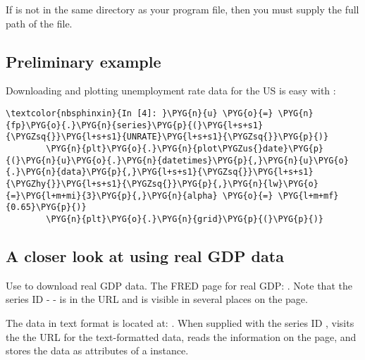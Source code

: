 \documentclass[letterpaper,10pt,openany,oneside,english]{sphinxmanual}
\begin{document}
If  is not in the same directory as your program
file, then you must supply the full path of the file.


\subsection{Preliminary example}
\label{\detokenize{fredpy_examples:Preliminary-example}}
Downloading and plotting unemployment rate data for the US is easy with
:

%
\begin{Verbatim}[commandchars=\\\{\}]
\textcolor{nbsphinxin}{In [4]: }\PYG{n}{u} \PYG{o}{=} \PYG{n}{fp}\PYG{o}{.}\PYG{n}{series}\PYG{p}{(}\PYG{l+s+s1}{\PYGZsq{}}\PYG{l+s+s1}{UNRATE}\PYG{l+s+s1}{\PYGZsq{}}\PYG{p}{)}
        \PYG{n}{plt}\PYG{o}{.}\PYG{n}{plot\PYGZus{}date}\PYG{p}{(}\PYG{n}{u}\PYG{o}{.}\PYG{n}{datetimes}\PYG{p}{,}\PYG{n}{u}\PYG{o}{.}\PYG{n}{data}\PYG{p}{,}\PYG{l+s+s1}{\PYGZsq{}}\PYG{l+s+s1}{\PYGZhy{}}\PYG{l+s+s1}{\PYGZsq{}}\PYG{p}{,}\PYG{n}{lw}\PYG{o}{=}\PYG{l+m+mi}{3}\PYG{p}{,}\PYG{n}{alpha} \PYG{o}{=} \PYG{l+m+mf}{0.65}\PYG{p}{)}
        \PYG{n}{plt}\PYG{o}{.}\PYG{n}{grid}\PYG{p}{(}\PYG{p}{)}
\end{Verbatim}

\noindent{}


\subsection{A closer look at  using real GDP data}
\label{\detokenize{fredpy_examples:A-closer-look-at-fredpy-using-real-GDP-data}}
Use  to download real GDP data. The FRED page for real GDP: . Note that the series ID -  - is in the URL and is visible in several places on the page.

The data in text format is located at: . When supplied with the series ID ,  visits the the URL for the text-formatted data, reads the information on the page, and stores the data as attributes of a {\hyperref[\detokenize{series_class:fredpy.series}]{}} instance.
\end{document}
